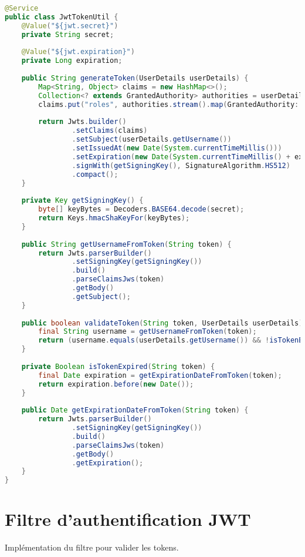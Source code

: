 \documentclass[12pt,a4paper]{report}
\begin{document}
\begin{lstlisting}[language=Java, caption=JwtTokenUtil.java]
@Service
public class JwtTokenUtil {
    @Value("${jwt.secret}")
    private String secret;
    
    @Value("${jwt.expiration}")
    private Long expiration;
    
    public String generateToken(UserDetails userDetails) {
        Map<String, Object> claims = new HashMap<>();
        Collection<? extends GrantedAuthority> authorities = userDetails.getAuthorities();
        claims.put("roles", authorities.stream().map(GrantedAuthority::getAuthority).collect(Collectors.toList()));
        
        return Jwts.builder()
                .setClaims(claims)
                .setSubject(userDetails.getUsername())
                .setIssuedAt(new Date(System.currentTimeMillis()))
                .setExpiration(new Date(System.currentTimeMillis() + expiration * 1000))
                .signWith(getSigningKey(), SignatureAlgorithm.HS512)
                .compact();
    }
    
    private Key getSigningKey() {
        byte[] keyBytes = Decoders.BASE64.decode(secret);
        return Keys.hmacShaKeyFor(keyBytes);
    }
    
    public String getUsernameFromToken(String token) {
        return Jwts.parserBuilder()
                .setSigningKey(getSigningKey())
                .build()
                .parseClaimsJws(token)
                .getBody()
                .getSubject();
    }
    
    public boolean validateToken(String token, UserDetails userDetails) {
        final String username = getUsernameFromToken(token);
        return (username.equals(userDetails.getUsername()) && !isTokenExpired(token));
    }
    
    private Boolean isTokenExpired(String token) {
        final Date expiration = getExpirationDateFromToken(token);
        return expiration.before(new Date());
    }
    
    public Date getExpirationDateFromToken(String token) {
        return Jwts.parserBuilder()
                .setSigningKey(getSigningKey())
                .build()
                .parseClaimsJws(token)
                .getBody()
                .getExpiration();
    }
}
\end{lstlisting}

\section{Filtre d'authentification JWT}
Implémentation du filtre pour valider les tokens.
\end{document}
